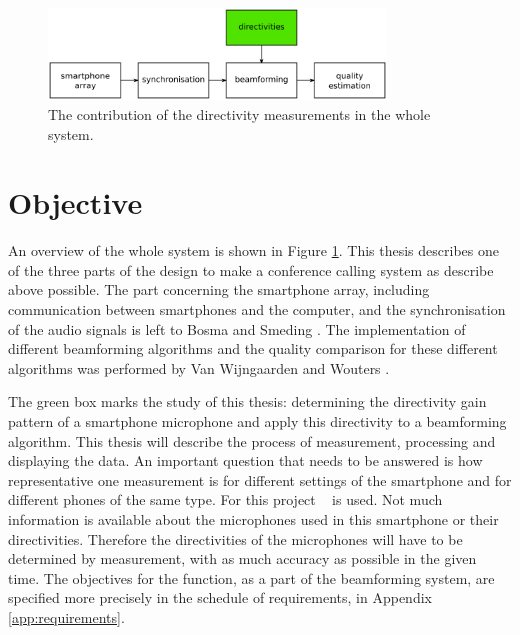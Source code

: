 \begin{figure}[h!]
    \centering
    \includegraphics[width=0.8\textwidth]{afbeeldingen/blokschema4.png}
	\caption[The contribution of the directivity measurements]{The contribution of the directivity measurements in the whole system.}
	\label{fig:system}
\end{figure}

\section{Objective}
An overview of the whole system is shown in Figure \ref{fig:system}.
This thesis describes one of the three parts of the design to make a conference calling system as describe above possible.
The part concerning the smartphone array, including communication between smartphones and the computer, and the synchronisation of the audio signals is left to Bosma and Smeding \cite{BAP:RoySjoerd}.
The implementation of different beamforming algorithms and the quality comparison for these different algorithms was performed by Van Wijngaarden and Wouters \cite{BAP:ErikNiels}.

The green box marks the study of this thesis: determining the directivity gain pattern of a smartphone microphone and apply this directivity to a beamforming algorithm.
This thesis will describe the process of measurement, processing and displaying the data.
An important question that needs to be answered is how representative one measurement is for different settings of the smartphone and for different phones of the same type. 
For this project \nexus~ is used. Not much information is available about the microphones used in this smartphone or their directivities.
Therefore the directivities of the microphones will have to be determined by measurement, with as much accuracy as possible in the given time. 
The objectives for the function, as a part of the beamforming system, are specified more precisely in the schedule of requirements, in Appendix \ref{app:requirements}. 

